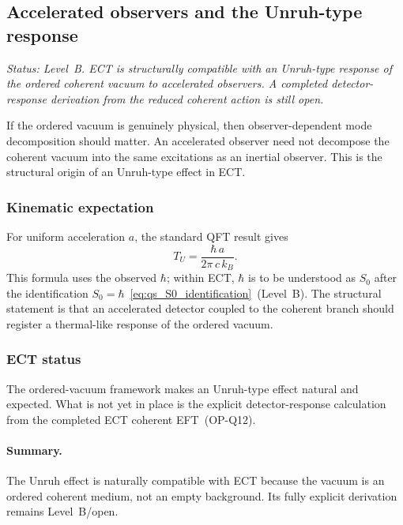\subsection{Accelerated observers and the Unruh-type response}
\label{sec:qs_unruh}

\textit{Status: Level~B.
ECT is structurally compatible with an Unruh-type response of the
ordered coherent vacuum to accelerated observers.
A completed detector-response derivation from the reduced coherent
action is still open.}

\medskip
If the ordered vacuum is genuinely physical, then observer-dependent
mode decomposition should matter.
An accelerated observer need not decompose the coherent vacuum into the
same excitations as an inertial observer.
This is the structural origin of an Unruh-type effect in ECT.

\subsubsection*{Kinematic expectation}

For uniform acceleration $a$, the standard QFT result gives
\begin{equation}
  \label{eq:qs_unruh_temp}
  T_U
  =
  \frac{\hbar\,a}{2\pi\,c\,k_B}.
\end{equation}
This formula uses the observed $\hbar$; within ECT, $\hbar$ is to be
understood as $S_0$ after the identification
$S_0=\hbar$~\eqref{eq:qs_S0_identification}~(Level~B).
The structural statement is that an accelerated detector coupled to the
coherent branch should register a thermal-like response of the ordered
vacuum.

\subsubsection*{ECT status}

The ordered-vacuum framework makes an Unruh-type effect natural and
expected.
What is not yet in place is the explicit detector-response calculation
from the completed ECT coherent EFT~(OP-Q12).

\paragraph{Summary.}
The Unruh effect is naturally compatible with ECT because the vacuum is
an ordered coherent medium, not an empty background.
Its fully explicit derivation remains Level~B/open.

